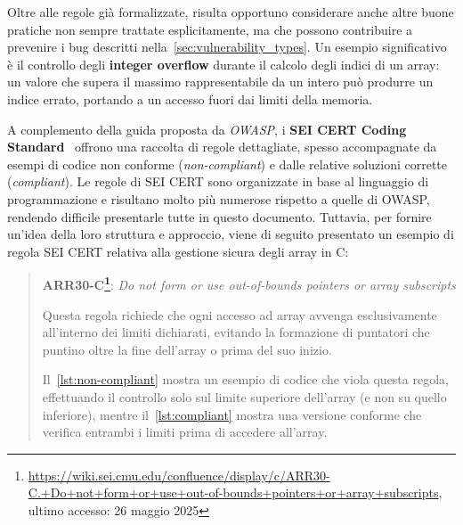 Oltre alle regole già formalizzate, risulta opportuno considerare anche altre
buone pratiche non sempre trattate esplicitamente, ma che possono contribuire a prevenire
i bug descritti nella~\autoref{sec:vulnerability_types}. Un esempio
significativo è il controllo degli \textbf{integer overflow} durante il calcolo degli
indici di un array: un valore che supera il massimo rappresentabile da un intero
può produrre un indice errato, portando a un accesso fuori dai limiti della memoria.

A complemento della guida proposta da \textit{OWASP}, i \textbf{SEI CERT Coding
Standard}~\cite{cert_coding_standard} offrono una raccolta di regole dettagliate,
spesso accompagnate da esempi di codice non conforme (\textit{non-compliant}) e
dalle relative soluzioni corrette (\textit{compliant}). Le regole di SEI CERT
sono organizzate in base al linguaggio di programmazione e risultano molto più
numerose rispetto a quelle di OWASP, rendendo difficile presentarle tutte in questo
documento. Tuttavia, per fornire un'idea della loro struttura e approccio, viene
di seguito presentato un esempio di regola SEI CERT relativa alla gestione
sicura degli array in C:

\begin{quote}
  \textbf{ARR30-C\protect\footnote{\url{https://wiki.sei.cmu.edu/confluence/display/c/ARR30-C.+Do+not+form+or+use+out-of-bounds+pointers+or+array+subscripts},
  ultimo accesso: 26 maggio 2025}}: \textit{Do not form or use out-of-bounds
  pointers or array subscripts}

  Questa regola richiede che ogni accesso ad array avvenga esclusivamente all'interno
  dei limiti dichiarati, evitando la formazione di puntatori che puntino oltre
  la fine dell'array o prima del suo inizio.

  \bigskip
  \noindent
  Il~\autoref{lst:non-compliant} mostra un esempio di codice che viola questa
  regola, effettuando il controllo solo sul limite superiore dell'array (e non
  su quello inferiore), mentre il~\autoref{lst:compliant} mostra una versione
  conforme che verifica entrambi i limiti prima di accedere all'array.
\end{quote}


